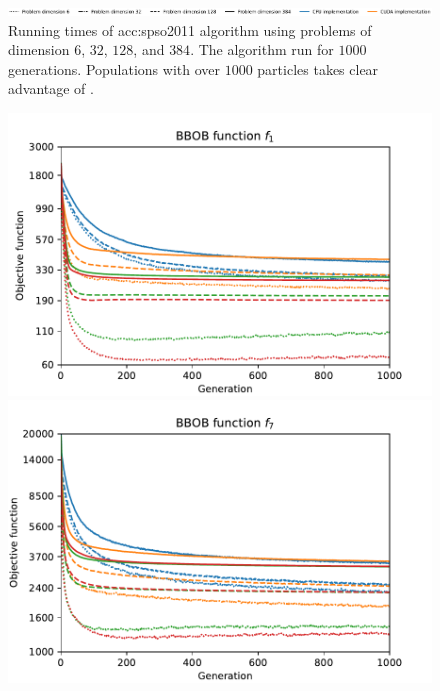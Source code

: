 \begin{figure}[ht!]
\begin{minipage}[t]{0.32\textwidth}
    \end{minipage}

    \begin{minipage}{\textwidth}
        \centering
        \includegraphics[width=\textwidth]{img/runs/time_pso2011_alldim_legend.pdf}
    \end{minipage}

    \caption[PSO2011 running times]{Running times of \acrlong{acc:spso2011} algorithm using problems of dimension $6$, $32$, $128$, and $384$. The algorithm run for $1000$ generations. Populations with over $1000$ particles takes clear advantage of \gpu.}
\end{figure}

\begin{figure}[ht!]
    \begin{minipage}[t]{0.32\textwidth}
        \centering
        \includegraphics[width=\textwidth]{img/runs/fitness_pso2011_f1.pdf}
    \end{minipage}
    \hfill
    \begin{minipage}[t]{0.32\textwidth}
        \centering
        \includegraphics[width=\textwidth]{img/runs/fitness_pso2011_f7.pdf}

\end{minipage}
\end{figure}
